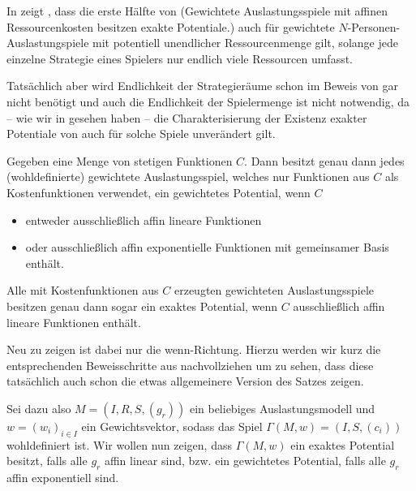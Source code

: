 In \cite[Abschnitt 8]{AUniversalCostrGenPotGames} zeigt \citeauthor{AUniversalCostrGenPotGames}, dass die erste Hälfte von  (\glqq Gewichtete Auslastungsspiele mit affinen Ressourcenkosten besitzen exakte Potentiale.\grqq) auch für gewichtete $N$-Personen-Auslastungspiele mit potentiell unendlicher Ressourcenmenge gilt, solange jede einzelne Strategie eines Spielers nur endlich viele Ressourcen umfasst. 

Tatsächlich aber wird Endlichkeit der Strategieräume schon im Beweis von \citeauthor{CharExGewPotinWCG} gar nicht benötigt und auch die Endlichkeit der Spielermenge ist nicht notwendig, da -- wie wir in  gesehen haben -- die Charakterisierung der Existenz exakter Potentiale von \citeauthor{MonShap} auch für solche Spiele unverändert gilt.

\begin{satz}\label{satz:CharExGewPotinWCG2}
	Gegeben eine Menge von stetigen Funktionen $C$. Dann besitzt genau dann jedes (wohldefinierte) gewichtete Auslastungsspiel, welches nur Funktionen aus $C$ als Kostenfunktionen verwendet, ein gewichtetes Potential, wenn $C$
	\begin{itemize}
		\item entweder ausschließlich affin lineare Funktionen
		\item oder ausschließlich affin exponentielle Funktionen mit gemeinsamer Basis enthält.
	\end{itemize}
	Alle mit Kostenfunktionen aus $C$ erzeugten gewichteten Auslastungsspiele besitzen genau dann sogar ein exaktes Potential, wenn $C$ ausschließlich affin lineare Funktionen enthält.
\end{satz}

Neu zu zeigen ist dabei nur die \glqq wenn\grqq-Richtung. Hierzu werden wir kurz die entsprechenden Beweisschritte aus \cite[Abschnitt 3]{CharExGewPotinWCG} nachvollziehen um zu sehen, dass diese tatsächlich auch schon die etwas allgemeinere Version des Satzes zeigen. 

Sei dazu also $M = (I, R, S, (g_r))$ ein beliebiges Auslastungsmodell und $w = (w_i)_{i \in I}$ ein Gewichtsvektor, sodass das Spiel $\Gamma(M, w) = (I, S, (c_i))$ wohldefiniert ist. Wir wollen nun zeigen, dass $\Gamma(M, w)$ ein exaktes Potential besitzt, falls alle $g_r$ affin linear sind, bzw. ein gewichtetes Potential, falls alle $g_r$ affin exponentiell sind.

\newcommand{\wrestr}{{w^r_{\ia\ib}}}


